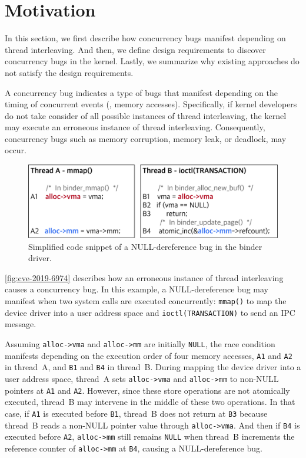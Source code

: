 \section{Motivation}
\label{s:motivation}

In this section, we first describe how concurrency bugs manifest
depending on thread interleaving.
%
And then, we define design requirements to discover concurrency bugs
in the kernel.
%
Lastly, we summarize why existing approaches do not satisfy the design
requirements.



%
A concurrency bug indicates a type of bugs that manifest depending on
the timing of concurrent events (\eg, memory accesses).
%
Specifically, if kernel developers do not take consider of all
possible instances of thread interleaving, the kernel may execute an
erroneous instance of thread interleaving.
%
Consequently, concurrency bugs such as memory corruption, memory leak,
or deadlock, may occur.


\begin{figure}[t]
  \centering
  \includegraphics[width=0.95\linewidth]{fig/cve-2017-10661.pdf}
  \caption{Simplified code snippet of a NULL-dereference bug in the
    binder driver.}
  \label{fig:cve-2019-6974}
\end{figure}

\autoref{fig:cve-2019-6974} describes how an erroneous instance of
thread interleaving causes a concurrency bug.
%
In this example, a NULL-dereference bug may manifest when two system
calls are executed concurrently: \texttt{mmap()} to map the device
driver into a user address space and \texttt{ioctl(TRANSACTION)} to
send an IPC message.


Assuming \texttt{alloc->vma} and \texttt{alloc->mm} are initially
\texttt{NULL}, the race condition manifests depending on the execution
order of four memory accesses, \texttt{A1} and \texttt{A2} in
thread~A, and \texttt{B1} and \texttt{B4} in thread~B.
%
During mapping the device driver into a user address space, thread~A
sets \texttt{alloc->vma} and \texttt{alloc->mm} to non-NULL pointers
at \texttt{A1} and \texttt{A2}.
%
However, since these store operations are not atomically executed,
thread~B may intervene in the middle of these two operations.
%
In that case, if \texttt{A1} is executed before \texttt{B1}, thread~B
does not return at \texttt{B3} because thread~B reads a non-NULL
pointer value through \texttt{alloc->vma}.
%
And then if \texttt{B4} is executed before \texttt{A2},
\texttt{alloc->mm} still remains \texttt{NULL} when thread~B
increments the reference counter of \texttt{alloc->mm} at \texttt{B4},
causing a NULL-dereference bug.



